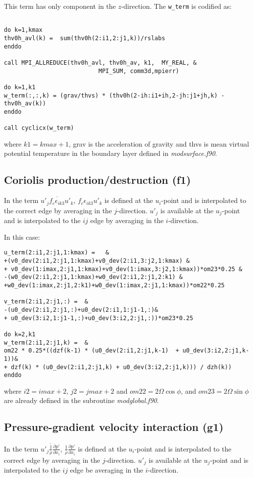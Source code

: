 \documentclass[10pt]{article}
\begin{document}
This term has only component in the $z$-direction. The \verb=w_term= is codified as:

\begin{verbatim}

do k=1,kmax
thv0h_avl(k) =  sum(thv0h(2:i1,2:j1,k))/rslabs
enddo

call MPI_ALLREDUCE(thv0h_avl, thv0h_av, k1,  MY_REAL, &
                           MPI_SUM, comm3d,mpierr)

do k=1,k1
w_term(:,:,k) = (grav/thvs) * (thv0h(2-ih:i1+ih,2-jh:j1+jh,k) - thv0h_av(k))
enddo
    
call cyclicx(w_term)
 \end{verbatim}

\noindent where $k1=kmax+1$, grav is the acceleration of gravity and thvs is mean virtual potential temperature in the boundary 
layer defined in \emph{modsurface.f90}.

\subsection{Coriolis production/destruction (f1)}
In the term $\overline{u'_j  f_c \epsilon_{ik3} u'_k}$, $f_c \epsilon_{ik3} u'_k$ is defined at the $u_i$-point and is 
interpolated to the correct edge by averaging in the $j$-direction. $u'_j$ is available at the $u_j$-point 
and is interpolated to the $ij$ edge by averaging in the $i$-direction.

In this case:

\begin{verbatim}
u_term(2:i1,2:j1,1:kmax) =   &
+(v0_dev(2:i1,2:j1,1:kmax)+v0_dev(2:i1,3:j2,1:kmax) &
+ v0_dev(1:imax,2:j1,1:kmax)+v0_dev(1:imax,3:j2,1:kmax))*om23*0.25 &
-(w0_dev(2:i1,2:j1,1:kmax)+w0_dev(2:i1,2:j1,2:k1) &
+w0_dev(1:imax,2:j1,2:k1)+w0_dev(1:imax,2:j1,1:kmax))*om22*0.25

v_term(2:i1,2:j1,:) =  &
-(u0_dev(2:i1,2:j1,:)+u0_dev(2:i1,1:j1-1,:)&
+ u0_dev(3:i2,1:j1-1,:)+u0_dev(3:i2,2:j1,:))*om23*0.25

do k=2,k1
w_term(2:i1,2:j1,k) =  &
om22 * 0.25*((dzf(k-1) * (u0_dev(2:i1,2:j1,k-1)  + u0_dev(3:i2,2:j1,k-1))&
+ dzf(k) * (u0_dev(2:i1,2:j1,k) + u0_dev(3:i2,2:j1,k))) / dzh(k)) 
enddo 
\end{verbatim}

\noindent where $i2=imax+2$, $j2=jmax+2$ and $om22=2\Omega\cos\phi$,
and $om23=2\Omega\sin\phi$ are already defined in the subroutine
\emph{modglobal.f90}.

\subsection{Pressure-gradient velocity interaction (g1)}
In the term $\overline{u'_j \frac{1}{\overline{\rho}} \frac{\partial p'}{\partial x_i}}$, 
$\frac{1}{\overline{\rho}} \frac{\partial p'}{\partial x_i}$ is defined at the $u_i$-point and is interpolated 
to the correct edge by averaging in the $j$-direction. $u'_j$ is available at the $u_j$-point and is interpolated to the $ij$ edge be 
averaging in the $i$-direction.
\end{document}
